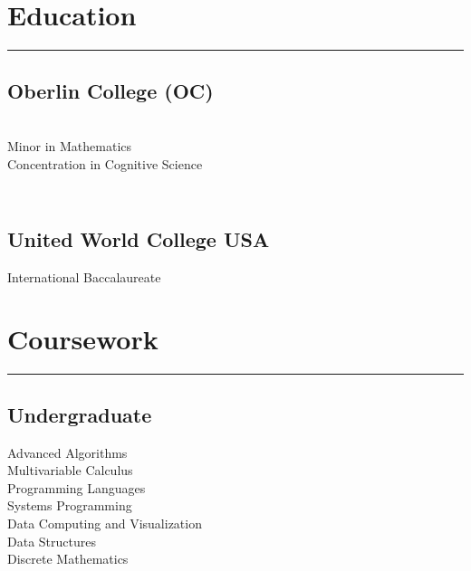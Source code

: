 \documentclass[]{dafirebanks-resume-openfont}
\begin{document}
%
%



%
%

\begin{minipage}[t]{0.33\textwidth} 


\section{Education} \vspace{-3pt}
{\color{blue}\hrule width 88pt}\vspace{5pt}
\subsection{Oberlin College (OC)}
\\
Minor in Mathematics \\ 
Concentration in Cognitive Science \\

\subsection{\\United World College USA}
International Baccalaureate \\
\sectionsep


\section{Coursework}
\vspace{-3pt}
{\color{blue} \hrule width 107pt} \vspace{5pt}
\subsection{Undergraduate}
Advanced Algorithms \\
Multivariable Calculus \\
Programming Languages \\ 
Systems Programming \\
Data Computing and Visualization \\
Data Structures \\ 
Discrete Mathematics \\
\sectionsep


\end{minipage}
\end{document}
